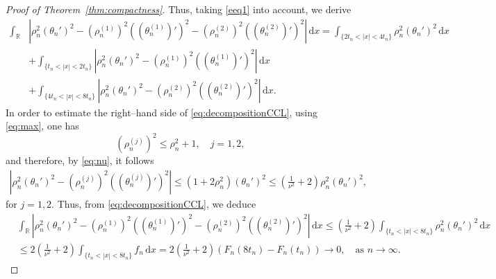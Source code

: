 \documentclass[11pt]{article}
\newcommand{\R}{\mathbb{R}}
\renewcommand{\d}{\,\mathrm{d}}
\theoremstyle{plain}
\theoremstyle{definition}
\theoremstyle{remark}
\numberwithin{equation}{section}
\begin{document}
{\begin{proof}[Proof of Theorem~\ref{thm:compactness}]
    Thus, taking \eqref{eeq1} into account, we derive    \begin{align}\label{eq:decompositionCCL}
    \int_\R &\left|\rho_n^2(\theta_n')^2  -(\rho_n^{(1)})^2((\theta_n^{(1)})')^2-(\rho_n^{(2)})^2((\theta_n^{(2)})')^2\right|\d x = \int_{\{2t_n<|x|<4t_n\}}\rho_n^2(\theta_n')^2\d x
        \\
        \nonumber & + \int_{\{t_n<|x|<2t_n\}}\left|\rho_n^2(\theta_n')^2-(\rho_n^{(1)})^2((\theta_n^{(1)})')^2\right|\d x 
        \\
        \nonumber &+  \int_{\{4t_n<|x|<8t_n\}}\left|\rho_n^2(\theta_n')^2-(\rho_n^{(2)})^2((\theta_n^{(2)})')^2\right|\d x.
    \end{align}
    In order to estimate the right--hand side of \eqref{eq:decompositionCCL}, using \eqref{eq:max}, one has 
    \[(\rho_n^{(j)})^2\leq\rho_n^2+1,\quad j=1,2,\]
    and therefore, by \eqref{eq:nu}, it follows 
    \begin{align*}
        |\rho_n^2(\theta_n')^2-(\rho_n^{(j)})^2((\theta_n^{(j)})')^2|\leq (1+2\rho_n^2)(\theta_n')^2\leq \left(\frac{1}{\nu^2}+2\right)\rho_n^2(\theta_n')^2,
    \end{align*}
    for $j=1,2$. Thus, from \eqref{eq:decompositionCCL}, we deduce
    \begin{align*}
    &\int_\R\left|\rho_n^2(\theta_n')^2-(\rho_n^{(1)})^2((\theta_n^{(1)})')^2-(\rho_n^{(2)})^2((\theta_n^{(2)})')^2\right|\d x \leq \left(\frac{1}{\nu^2}+2\right)\int_{\{t_n<|x|<8t_n\}}\rho_n^2(\theta_n')^2\d x
        \\
        &\leq  2\left(\frac{1}{\nu^2}+2\right)\int_{\{t_n<|x|<8t_n\}} f_n \d x=2\left(\frac{1}{\nu^2}+2\right)(F_n(8t_n)-F_n(t_n))\to 0,\quad\text{as }n\to\infty.
    \end{align*}
    

\end{proof}}
\end{document}

